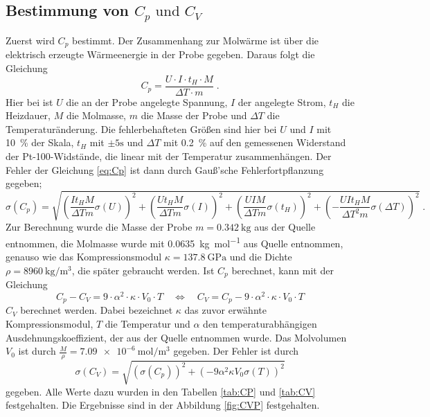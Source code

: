 \subsection{Bestimmung von \texorpdfstring{$C_p \text{ und } C_V$}{math}}
Zuerst wird $C_p$ bestimmt. Der Zusammenhang zur Molwärme ist über die elektrisch erzeugte 
Wärmeenergie in der Probe gegeben. Daraus folgt die Gleichung
\begin{equation}
C_p = \frac{U\cdot I \cdot t_H \cdot M}{\Delta T \cdot m} \; .
\label{eq:Cp}
\end{equation} 
Hier bei ist $U$ die an der Probe angelegte Spannung, $I$ der angelegte Strom, $t_H$ die Heizdauer, 
$M$ die Molmasse, $m$ die Masse der Probe und $\Delta T$ die Temperaturänderung. 
Die fehlerbehafteten Größen sind hier bei $U$ und $I$ mit \SI{10}{\percent} der Skala,
$t_H$ mit $ \pm 5\si{\second}$ und $\Delta T$ mit \SI{0.2}{\percent} auf den gemessenen Widerstand 
der Pt-100-Widstände, die linear mit der Temperatur zusammenhängen. Der Fehler der 
Gleichung \eqref{eq:Cp} ist dann durch Gauß'sche Fehlerfortpflanzung gegeben;
\begin{equation}
\sigma(C_{p} )= \sqrt{\left(\frac{I t_H  M }{\Delta T  m} \sigma(U) \right)^2 + 
\left(\frac{U t_H  M}{\Delta T  m} \sigma(I) \right)^2 + 
\left(\frac{U  I  M}{\Delta T  m}\sigma(t_H) \right)^2 + 
\left(-\frac{U  I  t_H  M }{ \Delta T^2  m } \sigma(\Delta T) \right)^2 } \; .
\end{equation}
Zur Berechnung wurde die Masse der Probe $m = \SI{0.342}{\kilo\gram}$ aus der Quelle 
\cite{Anleitung} entnommen, die Molmasse wurde mit \SI{0.0635}{\kilo\gram\per\mol} aus Quelle 
\cite{Kupfer} entnommen, genauso wie das Kompressionsmodul $\kappa = \SI{137,8}{\giga\pascal}$ und 
die Dichte $\rho = \SI{8960}{\kilo\gram\per\cubic\meter}$, die später gebraucht werden. Ist $C_p$ 
berechnet, kann mit der Gleichung
\begin{equation}
C_p - C_V = 9\cdot \alpha^2 \cdot  \kappa \cdot V_0 \cdot T 
\quad \iff \quad 
C_V = C_p - 9\cdot \alpha^2 \cdot \kappa \cdot V_0 \cdot T  
\label{eq:Cv}
\end{equation}
$C_V$ berechnet werden.  Dabei bezeichnet $\kappa$ das zuvor erwähnte Kompressionsmodul, $T$ die 
Temperatur und $\alpha$ den temperaturabhängigen Ausdehnungskoeffizient, 
der aus der Quelle \cite{Anleitung} entnommen 
wurde. Das Molvolumen $V_0$ ist durch $\frac{M}{\rho} = \SI{7.09e-6}{\mol\per\cubic\meter}$ 
gegeben. Der Fehler ist durch 
\begin{equation}
\sigma(C_V) = \sqrt{\left(\sigma(C_p) \right)^2 + \left( -9\alpha^2 \kappa V_0 \sigma(T)\right)^2}
\end{equation} 
gegeben. Alle Werte dazu wurden in den Tabellen \ref{tab:CP} und \ref{tab:CV} festgehalten. 
Die Ergebnisse sind in der Abbildung \ref{fig:CVP} festgehalten. 

